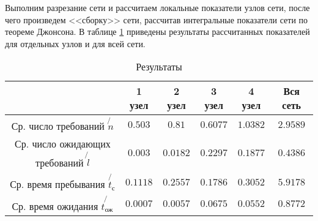 Выполним разрезание сети и рассчитаем локальные показатели узлов сети, после чего произведем <<сборку>> сети, рассчитав интегральные показатели сети по теореме Джонсона. В таблице \ref{tab:results} приведены результаты рассчитанных показателей для отдельных узлов и для всей сети.
\begin{table}[H]
	\begin{center}
		\caption{Результаты}
		\label{tab:results}
		\def\tabcolsep{4pt}
		\begin{tabular}{|c|c|c|c|c|c|}
			\hline
			& 1 узел & 2 узел & 3 узел & 4 узел & Вся сеть \\
			\hline
			Ср. число требований $\not{n}$ & $0.503 $ & $0.81  $ & $0.6077$ & $1.0382$ & $2.9589$ \\
			\hline
			Ср. число ожидающих требований $\not{l}$ & $0.003 $ & $0.0182$ & $0.2297$ & $0.1877$ & $0.4386$ \\
			\hline
			Ср. время пребывания $\not{t_\text{с}}$ & $0.1118$ & $0.2557$ & $0.1786$ & $0.3052$ & $5.9178$ \\
			\hline
			Ср. время ожидания $\not{t_\text{ож}}$ & $0.0007$ & $0.0057$ & $0.0675$ & $0.0552$ & $0.8772$ \\
			\hline	
		\end{tabular}
	\end{center}
\end{table}


